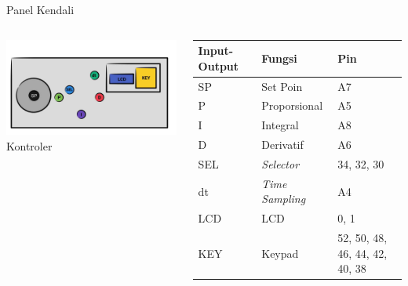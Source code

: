\documentclass[10pt,xcolor={dvipsnames}]{beamer}
\begin{document}
	\begin{frame}{Panel Kendali}
		\begin{columns}[T]
			\begin{column}{0.48\textwidth}
				\centering
				\includegraphics[width=7cm]{Gambar Lain/KONTORU.jpg}
				Kontroler
			\end{column}
			\begin{column}{0.48\textwidth}
				\begin{tabular}{ | m{1cm} | m{2.5cm}| m{2cm}|} 
					\hline
					\textbf{Input-Output} & \textbf{Fungsi} & \textbf{Pin} \\ 
					\hline
					SP & Set Poin & A7\\ 
					\hline
					P & Proporsional & A5 \\
					\hline
					I & Integral & A8 \\
					\hline
					D & Derivatif & A6 \\
					\hline
					SEL & \textit{Selector} & 34, 32, 30 \\
					\hline
					dt & \textit{Time Sampling} & A4 \\
					\hline
					LCD & LCD & 0, 1 \\
					\hline
					KEY & Keypad & 52, 50, 48, 46, 44, 42, 40, 38 \\
					\hline
				\end{tabular}
			\end{column}
		\end{columns}
	\end{frame}
\end{document}
